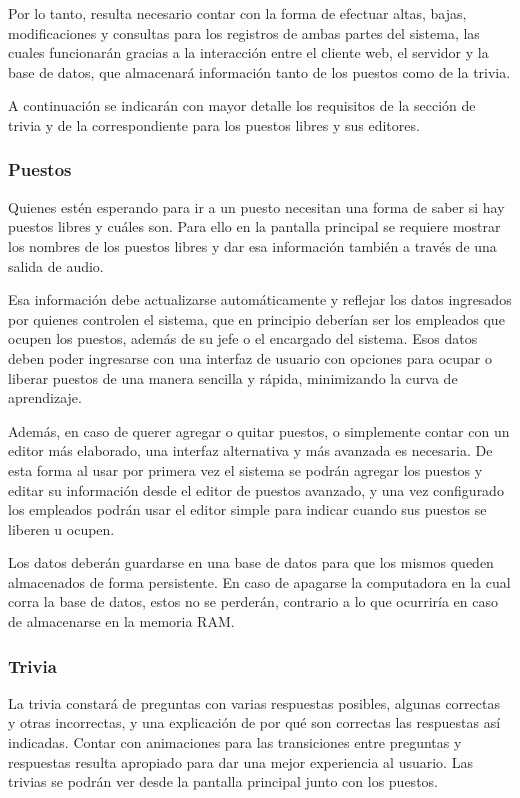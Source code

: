 \documentclass[twoside]{article}
\begin{document}
Por lo tanto, resulta necesario contar con la forma de efectuar altas, bajas, modificaciones y consultas para los registros de ambas partes del sistema, las cuales funcionarán gracias a la interacción entre el cliente web, el servidor y la base de datos, que almacenará información tanto de los puestos como de la trivia.

A continuación se indicarán con mayor detalle los requisitos de la sección de trivia y de la correspondiente para los puestos libres y sus editores.
\subsubsection{Puestos}
Quienes estén esperando para ir a un puesto necesitan una forma de saber si hay puestos libres y cuáles son. Para ello en la pantalla principal se requiere mostrar los nombres de los puestos libres y dar esa información también a través de una salida de audio.

Esa información debe actualizarse automáticamente y reflejar los datos ingresados por quienes controlen el sistema, que en principio deberían ser los empleados que ocupen los puestos, además de su jefe o el encargado del sistema. Esos datos deben poder ingresarse con una interfaz de usuario con opciones para ocupar o liberar puestos de una manera sencilla y rápida, minimizando la curva de aprendizaje. 

Además, en caso de querer agregar o quitar puestos, o simplemente contar con un editor más elaborado, una interfaz alternativa y más avanzada es necesaria. De esta forma al usar por primera vez el sistema se podrán agregar los puestos y editar su información desde el editor de puestos avanzado, y una vez configurado los empleados podrán usar el editor simple para indicar cuando sus puestos se liberen u ocupen.

Los datos deberán guardarse en una base de datos para que los mismos queden almacenados de forma persistente. En caso de apagarse la computadora en la cual corra la base de datos, estos no se perderán, contrario a lo que ocurriría en caso de almacenarse en la memoria RAM.
\subsubsection{Trivia}
La trivia constará de preguntas con varias respuestas posibles, algunas correctas y otras incorrectas, y una explicación de por qué son correctas las respuestas así indicadas. Contar con animaciones para las transiciones entre preguntas y respuestas resulta apropiado para dar una mejor experiencia al usuario. Las trivias se podrán ver desde la pantalla principal junto con los puestos.
\end{document}
